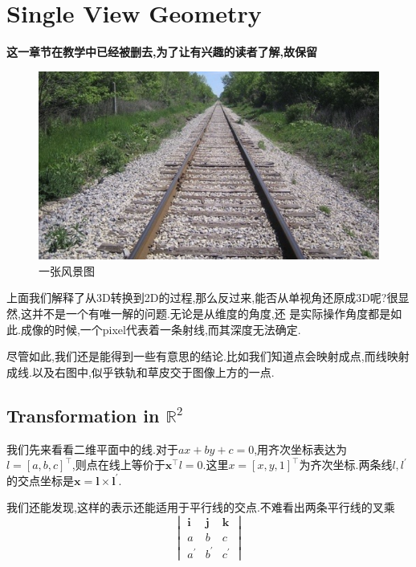 \section{Single View Geometry}

\textbf{这一章节在教学中已经被删去,为了让有兴趣的读者了解,故保留}

\begin{figure}
	\includegraphics[scale=0.35]{figures/pic_1.png}
	\caption{一张风景图}
\end{figure}
上面我们解释了从3D转换到2D的过程,那么反过来,能否从单视角还原成3D呢?很显然,这并不是一个有唯一解的问题.无论是从维度的角度,还
是实际操作角度都是如此.成像的时候,一个pixel代表着一条射线,而其深度无法确定.

尽管如此,我们还是能得到一些有意思的结论.比如我们知道点会映射成点,而线映射成线.以及右图中,似乎铁轨和草皮交于图像上方的一点.


\subsection{Transformation in $\mathbb R^2$}

我们先来看看二维平面中的线.对于$ax+by+c = 0$,用齐次坐标表达为$l = [a, b, c]^\top$,则点在线上等价于$\bm x^\top l = 0$.这里$x = [x, y, 1]^\top$为齐次坐标.两条线$l, l^\prime$的交点坐标是$\bm x = \bm l \times \bm l^\prime$.

我们还能发现,这样的表示还能适用于平行线的交点.不难看出两条平行线的叉乘
\begin{equation}
	\begin{vmatrix}
		\bm i & \bm j &\bm k
		\\
		a & b & c
		\\
		a^\prime & b^\prime & c^\prime
	\end{vmatrix}
\end{equation}


